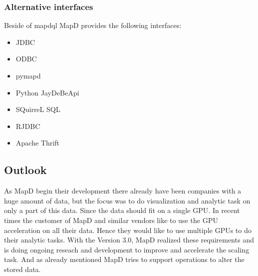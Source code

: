 \subsubsection{Alternative interfaces}
Beside of mapdql MapD provides the following interfaces:
\begin{itemize}
 \item JDBC
 \item ODBC
 \item pymapd
 \item Python JayDeBeApi
 \item SQuirreL SQL
 \item RJDBC
 \item Apache Thrift
\end{itemize}

\subsection{Outlook}
As MapD begin their development there already have been companies with a huge amount of data, but the focus was to do visualization and analytic task on only a part of this data.
Since the data should fit on a single GPU.
In recent times the customer of MapD and similar vendors like to use the GPU acceleration on all their data. Hence they would like to use multiple GPUs to do their analytic tasks.
With the Version 3.0, MapD realized these requirements and is doing ongoing reseach and development to improve and accelerate the scaling task. \cite{trillionrow}
And as already mentioned MapD tries to support operations to alter the stored data.
